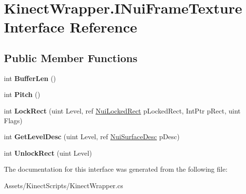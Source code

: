 \hypertarget{interface_kinect_wrapper_1_1_i_nui_frame_texture}{}\section{Kinect\+Wrapper.\+I\+Nui\+Frame\+Texture Interface Reference}
\label{interface_kinect_wrapper_1_1_i_nui_frame_texture}
\subsection*{Public Member Functions}
\begin{DoxyCompactItemize}
\item 
\mbox{\label{interface_kinect_wrapper_1_1_i_nui_frame_texture_ab8209a380175eb9615897d3bfaaf4814}} 
int {\bfseries Buffer\+Len} ()
\item 
\mbox{\label{interface_kinect_wrapper_1_1_i_nui_frame_texture_a26276f514de9e0deb6230593892d594d}} 
int {\bfseries Pitch} ()
\item 
\mbox{\label{interface_kinect_wrapper_1_1_i_nui_frame_texture_a220d82f521ec76fc83403c324c7cb797}} 
int {\bfseries Lock\+Rect} (uint Level, ref \mbox{\hyperlink{struct_kinect_wrapper_1_1_nui_locked_rect}{Nui\+Locked\+Rect}} p\+Locked\+Rect, Int\+Ptr p\+Rect, uint Flags)
\item 
\mbox{\label{interface_kinect_wrapper_1_1_i_nui_frame_texture_a852f650aae40e55958a4780017e3c191}} 
int {\bfseries Get\+Level\+Desc} (uint Level, ref \mbox{\hyperlink{struct_kinect_wrapper_1_1_nui_surface_desc}{Nui\+Surface\+Desc}} p\+Desc)
\item 
\mbox{\label{interface_kinect_wrapper_1_1_i_nui_frame_texture_a51d2dd6849585641662053fc5f2ec36f}} 
int {\bfseries Unlock\+Rect} (uint Level)
\end{DoxyCompactItemize}


The documentation for this interface was generated from the following file\+:\begin{DoxyCompactItemize}
\item 
Assets/\+Kinect\+Scripts/Kinect\+Wrapper.\+cs\end{DoxyCompactItemize}
